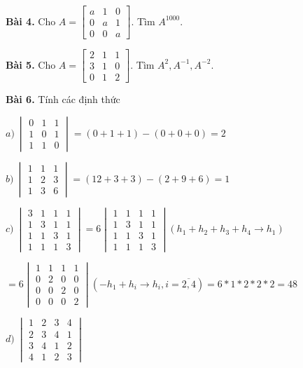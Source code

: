 \documentclass[12pt]{report}
\begin{document}
\textbf{Bài 4.} Cho $A = \begin{bmatrix} a & 1 & 0 \\ 0 & a & 1 \\ 0 & 0 & a \end{bmatrix}$. Tìm $A^{1000}$.

\textbf{Bài 5.} Cho $A = \begin{bmatrix} 2 & 1 & 1 \\ 3 & 1 & 0 \\ 0 & 1 & 2 \end{bmatrix}$. Tìm $A^2, A^{-1}, A^{-2}$.

\textbf{Bài 6.} Tính các định thức

$a)\ \begin{vmatrix} 0 & 1 & 1 \\ 1 & 0 & 1 \\ 1 & 1 & 0 \end{vmatrix} = (0 + 1 + 1) - (0 + 0 + 0) = 2$

$b)\ \begin{vmatrix} 1 & 1 & 1 \\ 1 & 2 & 3 \\ 1 & 3 & 6 \end{vmatrix} = (12 + 3 + 3) - (2 + 9 + 6) = 1$

$c)\ \begin{vmatrix} 3 & 1 & 1 & 1 \\ 1 & 3 & 1 & 1 \\ 1 & 1 & 3 & 1 \\ 1 & 1 & 1 & 3 \end{vmatrix} = 6\begin{vmatrix} 1 & 1 & 1 & 1 \\ 1 & 3 & 1 & 1 \\ 1 & 1 & 3 & 1 \\ 1 & 1 & 1 & 3 \end{vmatrix}(h_1 + h_2 + h_3 + h_ 4 \to h_1)$

$= 6\begin{vmatrix} 1 & 1 & 1 & 1 \\ 0 & 2 & 0 & 0 \\ 0 & 0 & 2 & 0 \\ 0 & 0 & 0 & 2 \end{vmatrix}(-h_1 + h_i \to h_i, i=\overline{2,4}) = 6*1*2*2*2 = 48$

$d)\ \begin{vmatrix} 1 & 2 & 3 & 4 \\ 2 & 3 & 4 & 1 \\ 3 & 4 & 1 & 2 \\ 4 & 1 & 2 & 3 \end{vmatrix}$
\end{document}

